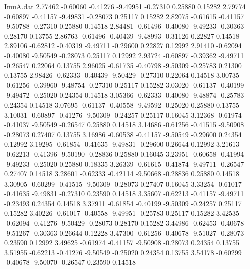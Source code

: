\begin{filecontents}{ImuA.dat}
   2.77462   -0.60060   -0.41276   -9.49951   -0.27310    0.25880    0.15282
   2.79774   -0.60897   -0.41157   -9.49831   -0.28073    0.25117    0.15282
   2.82075   -0.61615   -0.41157   -9.50788   -0.27310    0.25880    0.14518
   2.84481   -0.61496   -0.40080   -9.49233   -0.30363    0.28170    0.13755
   2.86763   -0.61496   -0.40439   -9.48993   -0.31126    0.22827    0.14518
   2.89106   -0.62812   -0.40319   -9.49711   -0.29600    0.22827    0.12992
   2.91410   -0.62094   -0.40080   -9.50549   -0.28073    0.25117    0.12992
   2.93724   -0.60897   -0.39362   -9.49711   -0.26547    0.22064    0.13755
   2.96025   -0.61735   -0.40798   -9.50309   -0.25783    0.21300    0.13755
   2.98426   -0.62333   -0.40439   -9.50429   -0.27310    0.22064    0.14518
   3.00735   -0.61256   -0.39960   -9.48754   -0.27310    0.25117    0.15282
   3.03020   -0.61137   -0.40199   -9.49472   -0.25020    0.24354    0.14518
   3.05366   -0.62333   -0.40080   -9.48874   -0.25783    0.24354    0.14518
   3.07695   -0.61137   -0.40558   -9.49592   -0.25020    0.25880    0.13755
   3.10031   -0.60897   -0.41276   -9.50309   -0.24257    0.25117    0.16045
   3.12368   -0.61974   -0.41037   -9.50549   -0.26547    0.25880    0.14518
   3.14686   -0.61256   -0.41515   -9.50908   -0.28073    0.27407    0.13755
   3.16986   -0.60538   -0.41157   -9.50549   -0.29600    0.24354    0.12992
   3.19295   -0.61854   -0.41635   -9.49831   -0.29600    0.26644    0.12992
   3.21613   -0.62213   -0.41396   -9.50190   -0.28836    0.25880    0.16045
   3.23951   -0.60658   -0.41994   -9.49233   -0.25020    0.25880    0.18335
   3.26339   -0.61615   -0.41874   -9.49711   -0.26547    0.27407    0.14518
   3.28601   -0.62333   -0.42114   -9.50668   -0.28836    0.25880    0.14518
   3.30905   -0.60299   -0.41515   -9.50309   -0.28073    0.27407    0.16045
   3.33254   -0.61017   -0.41635   -9.49831   -0.27310    0.23590    0.14518
   3.35607   -0.62213   -0.41157   -9.49711   -0.23493    0.24354    0.14518
   3.37911   -0.61854   -0.40199   -9.50309   -0.24257    0.25117    0.15282
   3.40226   -0.61017   -0.40558   -9.49951   -0.25783    0.25117    0.15282
   3.42535   -0.62094   -0.41276   -9.50429   -0.28073    0.28170    0.15282
   3.44986   -0.62453   -0.40678   -9.51267   -0.30363    0.26644    0.12228
   3.47300   -0.61256   -0.40678   -9.51027   -0.28073    0.23590    0.12992
   3.49625   -0.61974   -0.41157   -9.50908   -0.28073    0.24354    0.13755
   3.51955   -0.62213   -0.41276   -9.50549   -0.25020    0.24354    0.13755
   3.54178   -0.60299   -0.40678   -9.50070   -0.26547    0.23590    0.14518

\end{filecontents}

